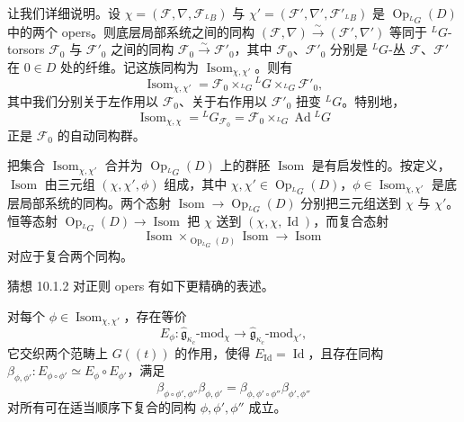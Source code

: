 让我们详细说明。设 $\chi=(\mathcal{F},\nabla,\mathcal{F}_{{}^LB})$ 与 $\chi'=(\mathcal{F}',\nabla',\mathcal{F}'_{{}^LB})$ 是 $\operatorname{Op}_{{}^LG}(D)$ 中的两个 opers。则底层局部系统之间的同构 $(\mathcal{F},\nabla)\xrightarrow{\sim}(\mathcal{F}',\nabla')$ 等同于 ${}^LG$-torsors $\mathcal{F}_0$ 与 $\mathcal{F}'_0$ 之间的同构 $\mathcal{F}_0\xrightarrow{\sim}\mathcal{F}'_0$，其中 $\mathcal{F}_0$、$\mathcal{F}'_0$ 分别是 ${}^LG$-丛 $\mathcal{F}$、$\mathcal{F}'$ 在 $0\in D$ 处的纤维。记这族同构为 $\operatorname{Isom}_{\chi,\chi'}$。则有
\[
    \operatorname{Isom}_{\chi,\chi'}
    =\mathcal{F}_0\times_{{}^LG}{}^LG\times_{{}^LG}\mathcal{F}'_0,
\]
其中我们分别关于左作用以 $\mathcal{F}_0$、关于右作用以 $\mathcal{F}'_0$ 扭变 ${}^LG$。特别地，
\[
    \operatorname{Isom}_{\chi,\chi}
    ={}^LG_{\mathcal{F}_0}=\mathcal{F}_0\times_{{}^LG}\operatorname{Ad}{}^LG
\]
正是 $\mathcal{F}_0$ 的自动同构群。

把集合 $\operatorname{Isom}_{\chi,\chi'}$ 合并为 $\operatorname{Op}_{{}^LG}(D)$ 上的群胚 $\operatorname{Isom}$ 是有启发性的。按定义，$\operatorname{Isom}$ 由三元组 $(\chi,\chi',\phi)$ 组成，其中 $\chi,\chi'\in\operatorname{Op}_{{}^LG}(D)$，$\phi\in\operatorname{Isom}_{\chi,\chi'}$ 是底层局部系统的同构。两个态射 $\operatorname{Isom}\to\operatorname{Op}_{{}^LG}(D)$ 分别把三元组送到 $\chi$ 与 $\chi'$。恒等态射 $\operatorname{Op}_{{}^LG}(D)\to\operatorname{Isom}$ 把 $\chi$ 送到 $(\chi,\chi,\operatorname{Id})$，而复合态射
\[
    \operatorname{Isom}\times_{\operatorname{Op}_{{}^LG}(D)}\operatorname{Isom}
    \to\operatorname{Isom}
\]
对应于复合两个同构。

猜想 10.1.2 对正则 opers 有如下更精确的表述。

\begin{conjecture}
    对每个 $\phi\in\operatorname{Isom}_{\chi,\chi'}$，存在等价
    \[
        E_\phi:\hat{\mathfrak{g}}_{\kappa_c}\text{-mod}_\chi
        \to\hat{\mathfrak{g}}_{\kappa_c}\text{-mod}_{\chi'},
    \]
    它交织两个范畴上 $G((t))$ 的作用，使得 $E_{\operatorname{Id}}=\operatorname{Id}$，且存在同构
    $\beta_{\phi,\phi'}:E_{\phi\circ\phi'}\simeq E_\phi\circ E_{\phi'}$，满足
    \[
        \beta_{\phi\circ\phi',\phi''}\beta_{\phi,\phi'}
        =\beta_{\phi,\phi'\circ\phi''}\beta_{\phi',\phi''}
    \]
    对所有可在适当顺序下复合的同构 $\phi,\phi',\phi''$ 成立。
\end{conjecture}


